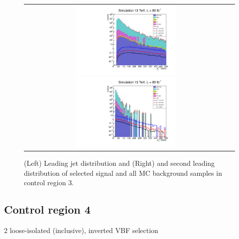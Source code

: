 \begin{figure}[tbh!]
	\centering
	\begin{tabular}{cc}
		\includegraphics[width=0.5\textwidth]{analysis/pics/h_jet1pt_Tau2LooseIsoInclusive.pdf}
		\includegraphics[width=0.5\textwidth]{analysis/pics/h_tau2pt_Tau2LooseIsoInclusive.pdf}
	\end{tabular}
	\caption{(Left) Leading jet \pt distribution and (Right) and second leading \hadtau \pt distribution of selected signal and all MC background samples in control region 3.}
	\label{fig::crplots2_Tau2LooseIsoInclusive_13tev}
\end{figure}

\subsection*{Control region 4}

\FloatBarrier

2 loose-isolated \hadtau (inclusive), inverted VBF selection

